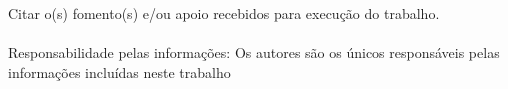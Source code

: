 \documentclass[a4,10pt,twocolumn]{article}
\begin{document}
Citar o(s) fomento(s) e/ou apoio recebidos para
execução do trabalho.
\\ \\ %
Responsabilidade pelas informações: Os autores são os únicos responsáveis pelas informações incluídas neste trabalho

\thispagestyle{secondpage}
\end{document}

